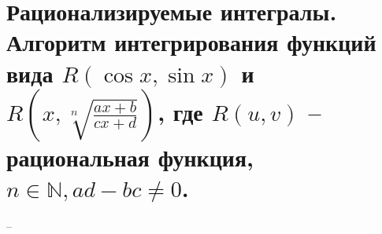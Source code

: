 \section{Рационализируемые интегралы. Алгоритм интегрирования функций вида $R(\cos{x}, \sin{x})$ и $R(x, \sqrt[n]{\frac{ax + b}{cx + d}})$, где $R(u, v)$ -- рациональная функция, $n \in \mathbb{N}, ad - bc \neq 0$.}
--
\newline